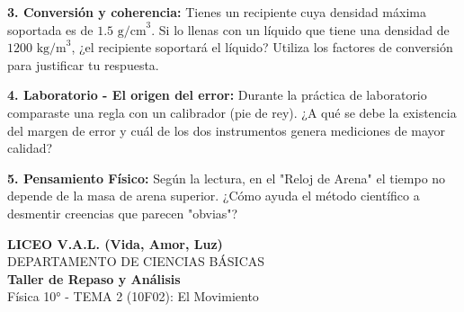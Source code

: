 \documentclass[12pt, letterpaper]{article}
\newif\ifshowanswers
\newcommand{\respAbierta}[2][3cm]{
	\ifshowanswers
	\par\vspace{0.2cm}
	\textbf{\textcolor{blue}{Respuesta Esperada:}} \textcolor{blue}{#2}
	\par\vspace{0.2cm}
	\else
	\par\vspace{#1} %
	\fi
}
\begin{document}
	\vspace{0.3cm}
	
	\noindent \textbf{3. Conversión y coherencia:} Tienes un recipiente cuya densidad máxima soportada es de $1.5 \text{ g/cm}^3$. Si lo llenas con un líquido que tiene una densidad de $1200 \text{ kg/m}^3$, ¿el recipiente soportará el líquido? Utiliza los factores de conversión para justificar tu respuesta.
	\respAbierta[4cm]{Se debe convertir $1200 \text{ kg/m}^3$ a $\text{g/cm}^3$:
		$1200 \frac{\text{kg}}{\text{m}^3} \cdot \left( \frac{1000 \text{ g}}{1 \text{ kg}} \right) \cdot \left( \frac{1 \text{ m}^3}{1.000.000 \text{ cm}^3} \right) = 1.2 \text{ g/cm}^3$.
		\textbf{Conclusión:} Como $1.2 \text{ g/cm}^3$ es menor que el límite de $1.5 \text{ g/cm}^3$, el recipiente SÍ soportará el líquido.}
	
	\vspace{0.3cm}
	
	\noindent \textbf{4. Laboratorio - El origen del error:} Durante la práctica de laboratorio comparaste una regla con un calibrador (pie de rey). ¿A qué se debe la existencia del margen de error y cuál de los dos instrumentos genera mediciones de mayor calidad?
	\respAbierta[3.5cm]{El margen de error siempre existe debido a limitaciones visuales y a la resolución del instrumento. El calibrador es de mayor calidad porque cuenta con un nonio que permite fraccionar el milímetro, ofreciendo mayor precisión y exactitud que una regla común.}
	
	\vspace{0.3cm}
	
	\noindent \textbf{5. Pensamiento Físico:} Según la lectura, en el "Reloj de Arena" el tiempo no depende de la masa de arena superior. ¿Cómo ayuda el método científico a desmentir creencias que parecen "obvias"?
	\respAbierta[3.5cm]{El método científico requiere experimentación y cuantificación estricta. Al aislar variables y medir con precisión, la física descubre que la intuición puede ser engañosa (como creer que más peso acelera la caída en el reloj), revelando las leyes reales que operan en la naturaleza.}
	\newpage
	\begin{center} 
		{\Large \textbf{LICEO V.A.L. (Vida, Amor, Luz)}}\\[0.1cm] 
		{\large DEPARTAMENTO DE CIENCIAS BÁSICAS}\\[0.1cm] 
		\textbf{Taller de Repaso y Análisis} \\[0.1cm] 
		Física 10° - TEMA 2 (10F02): El Movimiento
	\end{center}
	
\end{document}
